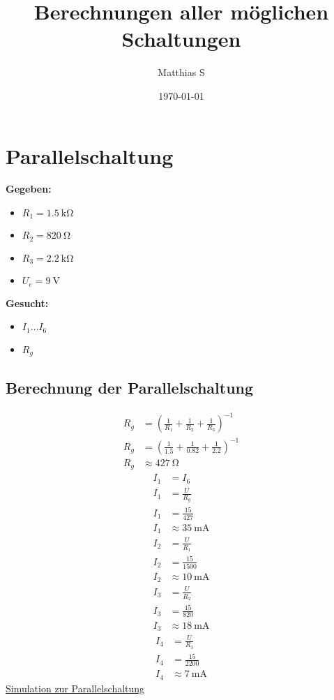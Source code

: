 \documentclass[12pt,a4paper]{amsart}
\begin{document}
\title{\textbf{Berechnungen aller möglichen Schaltungen}}
\author{Matthias S}
\date{\today}

\maketitle

\section{Parallelschaltung}
\textbf{Gegeben:}
\begin{itemize}
  \item $R_1 = \qty{1.5}\kohm$
  \item $R_2 = \qty{820}\ohm$
  \item $R_3 = \qty{2.2}\kohm$
  \item $U_e = \qty{9}\volt$
\end{itemize}

\textbf{Gesucht:}
\begin{itemize}
  \item $I_1 \dots I_6$
  \item $R_g$
\end{itemize}
\subsection{Berechnung der Parallelschaltung}
\begin{align*}
  R_g&=\left(\frac{1}{R_1}+\frac{1}{R_2}+\frac{1}{R_3}\right)^{-1}\\
  R_g&=\left(\frac{1}{1.5}+\frac{1}{0.82}+\frac{1}{2.2}\right)^{-1}\\
  R_g&\approx \qty{427}{\ohm}
\end{align*}
\begin{align*}
  I_1&=I_6\\
  I_1&=\frac{U}{R_g}\\
  I_1&=\frac{15}{427}\\
  I_1&\approx \qty{35}{\mA}
\end{align*}
\begin{align*}
  I_2&=\frac{U}{R_1}\\
  I_2&=\frac{15}{1500}\\
  I_2&\approx \qty{10}{\mA}
\end{align*}
\begin{align*}
  I_3&=\frac{U}{R_2}\\
  I_3&=\frac{15}{820}\\
  I_3&\approx \qty{18}{\mA}
\end{align*}
\begin{align*}
  I_4&=\frac{U}{R_3}\\
  I_4&=\frac{15}{2200}\\
  I_4&\approx \qty{7}{\mA}
\end{align*}
\href{https://www.falstad.com/circuit/circuitjs.html?ctz=CQAgjCAMB0l3BWcMBMcUHYMGZIA4UA2ATmIxAUgoqoQFMBaMMAKADcQ8rMVOrjCUIQBZ+QqjAQsATuEJUww4XO6ihYSpBkgUCQYuW7BKNVTxhi0UtZs3t2BLwMgHvExJ1otAdxUgBOnr+gj6BggGuwVAsvmDy4Eo6+AnKoUYpLpDKzqFxqtzJ7tG+6UW4hqYxLo4ZogqJoZFFdTqVsfFFeToYvGlBRaU9xdVuak1DfcZDXTzD4279EywADpnZieWtCuIrIC3OLZ07q2h4Gadb4Du+XFFdAazt3EO3s49+D-HO7+kB6d9VSIRGoAoA}{Simulation zur Parallelschaltung}
\end{document}
